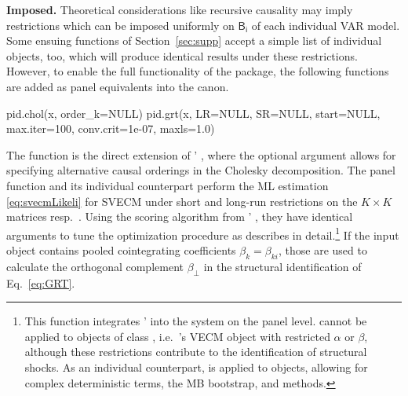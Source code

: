 \textbf{Imposed.} Theoretical considerations like recursive causality may imply restrictions which can be imposed uniformly on $ \mathsf{{B}_i} $ of each individual VAR model. Some ensuing functions of Section~\ref{sec:supp} accept a simple list of individual  objects, too, which will produce identical results under these restrictions. However, to enable the full functionality of the  package, the following functions are added as panel equivalents into the  canon. 
\begin{CodeChunk}
\begin{CodeInput}
pid.chol(x, order_k=NULL)
pid.grt(x, LR=NULL, SR=NULL, start=NULL, max.iter=100, conv.crit=1e-07, maxls=1.0)
\end{CodeInput}
\end{CodeChunk}
The function  is the direct extension of ' , where the optional argument  allows for specifying alternative causal orderings in the Cholesky decomposition. The panel function  and its individual counterpart perform the ML estimation \eqref{eq:svecmLikeli} for SVECM under short and long-run restrictions on the $ K \times K $ matrices  resp.~. Using the scoring algorithm from ' , they have identical arguments to tune the optimization procedure as \citet[Sec.~3.2]{Pfaff2008a} describes in detail.\footnote{This function integrates '  into the  system on the panel level.  cannot be applied to objects of class , i.e.~'s VECM object with restricted $ \alpha $ or $ \beta $, although these restrictions contribute to the identification of structural shocks. As an individual counterpart,  is applied to  objects, allowing for complex deterministic terms, the MB bootstrap, and  methods.} If the input object  contains pooled cointegrating coefficients $ \beta_k=\beta_{ki} $, those are used to calculate the orthogonal complement $ \beta_{\perp} $ in the structural identification of Eq.~\eqref{eq:GRT}.


